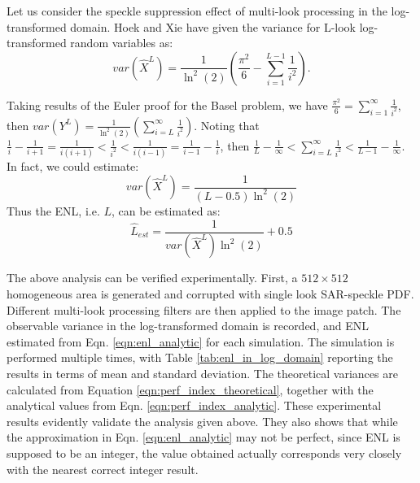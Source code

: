 \documentclass[journal]{IEEEtran}
\begin{document}
Let us consider the speckle suppression effect of multi-look processing in the log-transformed domain. 
Hoek \cite{Hoekman_1991_TGRS} and Xie \cite{Xie_2002_TGRS} have given the variance for L-look log-transformed random variables as: 
\begin{equation}
var(\hat{X}^L)= \frac{1}{\ln^2(2)} \left( \frac{\pi^2}{6} - \sum^{L-1}_{i=1}{\frac{1}{i^2}} \right).
\label{eqn:perf_index_theoretical}
\end{equation}

Taking results of the Euler proof for the Basel problem, we have $\frac{\pi^2}{6} = \sum^{\infty}_{i=1}{ \frac{1}{i^2} } $, then $var(Y^L)= \frac{1}{\ln^2(2)} \left( \sum^{\infty}_{i=L}{ \frac{1}{i^2} } \right) $.
Noting that $ \frac{1}{i} - \frac{1}{i+1} = \frac{1}{i(i+1)} < \frac{1}{i^2} < \frac{1}{i(i-1)} = \frac{1}{i-1} - \frac{1}{i}$, then $ \frac{1}{L} - \frac{1}{\infty} < \sum^{\infty}_{i=L}{ \frac{1}{i^2} }  < \frac{1}{L-1} - \frac{1}{\infty} $.
In fact, we could estimate:
\begin{equation}
  var(\hat{X}^L) = \frac{1}{(L-0.5) \ln^2(2) }
\label{eqn:perf_index_analytic}
\end{equation}
Thus the ENL, i.e. $L$, can be estimated as:
\begin{equation}
\hat{L}_{est} = \frac{1}{var(\hat{X}^L) \ln^2(2)} + 0.5
\label{eqn:enl_analytic}
\end{equation}

The above analysis can be verified experimentally. First, a $512\times512$ homogeneous area is generated and corrupted with single look SAR-speckle PDF. 
Different multi-look processing filters are then applied to the image patch. 
The observable variance in the log-transformed domain is recorded, and 
	 ENL estimated from Eqn. \ref{eqn:enl_analytic} for each simulation.
The simulation is performed multiple times, with Table \ref{tab:enl_in_log_domain} reporting the results in terms of mean and standard deviation.
The theoretical variances are calculated from Equation \ref{eqn:perf_index_theoretical}, 
	together with the analytical values from Eqn. \ref{eqn:perf_index_analytic}.
These experimental results evidently validate the analysis given above.
They also shows that 
	while the approximation in Eqn. \ref{eqn:enl_analytic} may not be perfect, 
	since ENL is supposed to be an integer, the value obtained actually corresponds very closely with the nearest correct integer result.
\end{document}
